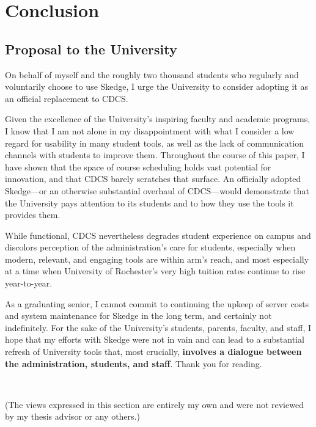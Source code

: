 
\chapter{Conclusion}

\vspace{-20pt}
\section{Proposal to the University}

On behalf of myself and the roughly two thousand students who regularly and voluntarily choose to use Skedge, I urge the University to consider adopting it as an official replacement to CDCS.

Given the excellence of the University's inspiring faculty and academic programs, I know that I am not alone in my disappointment with what I consider a low regard for usability in many student tools, as well as the lack of communication channels with students to improve them. Throughout the course of this paper, I have shown that the space of course scheduling holds vast potential for innovation, and that CDCS barely scratches that surface. An officially adopted Skedge---or an otherwise substantial overhaul of CDCS---would demonstrate that the University pays attention to its students and to how they use the tools it provides them.

While functional, CDCS nevertheless degrades student experience on campus and discolors perception of the administration's care for students, especially when modern, relevant, and engaging tools are within arm's reach, and most especially at a time when University of Rochester's very high tuition rates continue to rise year-to-year.

As a graduating senior, I cannot commit to continuing the upkeep of server costs and system maintenance for Skedge in the long term, and certainly not indefinitely. For the sake of the University's students, parents, faculty, and staff, I hope that my efforts with Skedge were not in vain and can lead to a substantial refresh of University tools that, most crucially, \textbf{involves a dialogue between the administration, students, and staff}. Thank you for reading.

\\
\vspace{10pt}

\noindent (The views expressed in this section are entirely my own and were not reviewed by my thesis advisor or any others.)


